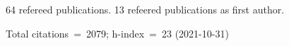 64 refereed publications. 13 refeered publications as first author.

Total citations~=~2079; h-index~=~23 (2021-10-31)
